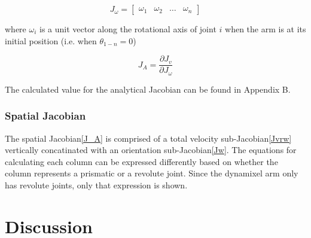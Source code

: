 \documentclass[10pt,journal]{IEEEtran}
\begin{document}
\begin{mycapequ}[!ht]
\begin{equation}\label{Jw}
	J_\omega = 
		\begin{bmatrix} 
			\omega_1 & \omega_2 & \dots & \omega_n 
		\end{bmatrix} 
\end{equation}
\caption{where $\omega_i$ is a unit vector along the rotational axis of joint $i$ when the arm is at its initial position (i.e. when $\theta_{1-n}=0$)}
\end{mycapequ}

\begin{equation}\label{J_A}
J_A = \frac{\partial J_v}{\partial J_\omega}
\end{equation}

The calculated value for the analytical Jacobian can be found in Appendix B.

\subsubsection{Spatial Jacobian}
The spatial Jacobian\ref{J_A} is comprised of a total velocity sub-Jacobian\ref{Jvrw} vertically concatinated with an orientation sub-Jacobian\ref{Jw}. The equations for calculating each column can be expressed differently based on whether the column represents a prismatic or a revolute joint. Since the dynamixel arm only has revolute joints, only that expression is shown.


\section{Discussion}

 
 
\end{document}
